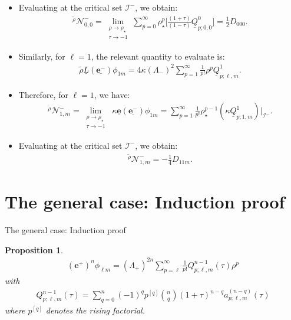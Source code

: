 \documentclass{beamer}
\theoremstyle{remark}
\theoremstyle{plain}
\newtheorem{proposition}{Proposition}
\theoremstyle{plain}
\begin{document}
\begin{frame}
  \begin{itemize}
    \item Evaluating at the critical set $\mathcal{I}^{-}$, we obtain:
    \begin{align}
      \mathcal{}^{\tilde{\rho}}\mathcal{N}^{-}_{0,0} = \lim_{\substack{\rho \to \rho_{\star} \\ \tau \to -1}}\sum_{p=0}^{\infty}\rho_{\star}^p\biggl[\frac{(1+\tau)}{(1-\tau)}\underline{Q}^{0}_{p;0,0}\biggr] = \frac{1}{2}D_{000}.
    \end{align}
    \item Similarly, for $\ell=1$, the relevant quantity to evaluate is:
    \begin{align}
      \tilde{\rho} \underline{L} (\underline{\boldsymbol{e}^{-}}) \phi_{1m}= 4\kappa(\Lambda_{-})^{2}\sum_{p=1}^{\infty}\frac{1}{p!}\rho^p\underline{Q}^{1}_{p;\ell,m}.
    \end{align}
    \item Therefore, for $\ell=1$, we have:
    \begin{align}
      \mathcal{}^{\tilde{\rho}}\mathcal{N}^{-}_{1,m} = \lim_{\substack{\rho \to \rho_{\star} \\ \tau \to -1}} \; \kappa\underline{\boldsymbol{e}}(\underline{\boldsymbol{e}^{-}})\phi_{1m} = \sum_{p=1}^{\infty}\frac{1}{p!}\rho_{\star}^{p-1}(\kappa \underline{Q}^{1}_{p;1,m})|_{\mathscr{I}^{-}}.
    \end{align}
    \item Evaluating at the critical set $\mathcal{I}^{-}$, we obtain:
    \begin{align}
      \mathcal{}^{\tilde{\rho}}\mathcal{N}^{-}_{1,m} = - \frac{1}{4}D_{11m}.
    \end{align}
  \end{itemize}
\end{frame}

\section{The general case: Induction proof}
\begin{frame}{The general case: Induction proof}
  \begin{proposition}\label{lemmaMainNPplus}
    \begin{align}\label{eq:bmelplusonephilm}
      (\boldsymbol{e}^{+})^{n}\phi_{\ell m} = (\Lambda_{+})^{2n}\sum_{p=\ell}^{\infty}\frac{1}{p!}Q^{n-1}_{p;\ell,m}(\tau)\rho^{p}
    \end{align}
    with
    \begin{align}\label{eq:Qn}
      Q^{n-1}_{p;\ell,m}(\tau)= \sum_{q=0}^{n}(-1)^q p^{[q]} {n \choose q}(1+\tau)^{n-q}a_{p;\ell,m}^{(n-q)}(\tau)
    \end{align}
    where $p^{[q]}$ denotes the rising factorial.
  \end{proposition}
\end{frame}
\end{document}
